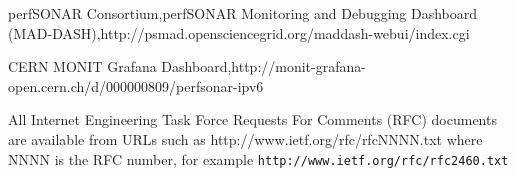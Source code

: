 \begin{thebibliography}{}
 perfSONAR Consortium,perfSONAR Monitoring and Debugging Dashboard (MAD-DASH),http://psmad.opensciencegrid.org/maddash-webui/index.cgi

 CERN  MONIT  Grafana  Dashboard,http://monit-grafana-open.cern.ch/d/000000809/perfsonar-ipv6



 All Internet Engineering Task Force Requests For Comments (RFC) documents are available
from URLs such as http://www.ietf.org/rfc/rfcNNNN.txt where NNNN is the RFC number, for example {\tt http://www.ietf.org/rfc/rfc2460.txt}


\end{thebibliography}

